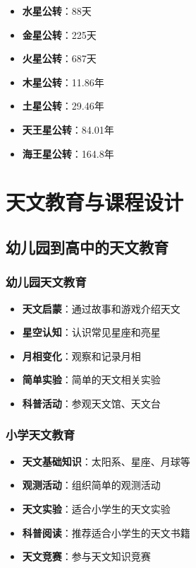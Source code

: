 \documentclass[12pt,UTF8]{ctexbook}
\begin{document}
\begin{itemize}
  \item \textbf{水星公转}：88天
  \item \textbf{金星公转}：225天
  \item \textbf{火星公转}：687天
  \item \textbf{木星公转}：11.86年
  \item \textbf{土星公转}：29.46年
  \item \textbf{天王星公转}：84.01年
  \item \textbf{海王星公转}：164.8年
\end{itemize}

\part{天文教育与课程设计}

\chapter{幼儿园到高中的天文教育}
\section{幼儿园天文教育}

\begin{itemize}
  \item \textbf{天文启蒙}：通过故事和游戏介绍天文
  \item \textbf{星空认知}：认识常见星座和亮星
  \item \textbf{月相变化}：观察和记录月相
  \item \textbf{简单实验}：简单的天文相关实验
  \item \textbf{科普活动}：参观天文馆、天文台
\end{itemize}

\section{小学天文教育}

\begin{itemize}
  \item \textbf{天文基础知识}：太阳系、星座、月球等
  \item \textbf{观测活动}：组织简单的观测活动
  \item \textbf{天文实验}：适合小学生的天文实验
  \item \textbf{科普阅读}：推荐适合小学生的天文书籍
  \item \textbf{天文竞赛}：参与天文知识竞赛
\end{itemize}
\end{document}
